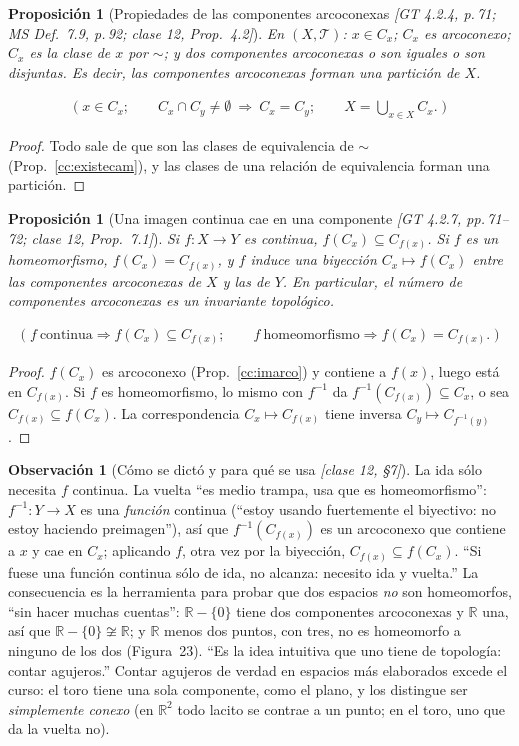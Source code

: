\documentclass[11pt,a4paper]{article}
\newcommand{\lgc}[1]{\par\vspace{-3pt}\begin{gather*}\big(\;#1\;\big)\end{gather*}\vspace{-6pt}}
\theoremstyle{definition}
\newtheorem{observacion}[definicion]{Observación}
\theoremstyle{plain}
\newtheorem{proposicion}[definicion]{Proposición}
\newcommand{\fnt}[1]{{\normalfont\small\itshape\color{gray!150!black}[#1]}}
\newcommand{\R}{\mathbb{R}}
\newcommand{\tp}{\mathcal{T}}
\begin{document}
\begin{proposicion}[Propiedades de las componentes arcoconexas \fnt{GT 4.2.4, p.\,71; MS Def.\ 7.9, p.\,92; clase 12, Prop.\ 4.2}]\label{cc:propcam}
En $(X,\tp)$: $x\in C_x$; $C_x$ es arcoconexo; $C_x$ es la clase de $x$ por $\sim$; y dos componentes arcoconexas o son iguales o son disjuntas. Es decir, las componentes arcoconexas forman una partición de $X$.
\lgc{x\in C_x;\qquad C_x\cap C_y\ne\emptyset\ \Rightarrow\ C_x=C_y;\qquad X=\bigcup_{x\in X}C_x.}
\end{proposicion}

\begin{proof}
Todo sale de que son las clases de equivalencia de $\sim$ (Prop.~\ref{cc:existecam}), y las clases de una relación de equivalencia forman una partición.
\end{proof}

\begin{proposicion}[Una imagen continua cae en una componente \fnt{GT 4.2.7, pp.\,71--72; clase 12, Prop.\ 7.1}]\label{cc:invcam}
Si $f:X\to Y$ es continua, $f(C_x)\subseteq C_{f(x)}$. Si $f$ es un homeomorfismo, $f(C_x)=C_{f(x)}$, y $f$ induce una biyección $C_x\mapsto f(C_x)$ entre las componentes arcoconexas de $X$ y las de $Y$. En particular, el número de componentes arcoconexas es un invariante topológico.
\lgc{f\ \text{continua}\Rightarrow f(C_x)\subseteq C_{f(x)};\qquad f\ \text{homeomorfismo}\Rightarrow f(C_x)=C_{f(x)}.}
\end{proposicion}

\begin{proof}
$f(C_x)$ es arcoconexo (Prop.~\ref{cc:imarco}) y contiene a $f(x)$, luego está en $C_{f(x)}$. Si $f$ es homeomorfismo, lo mismo con $f^{-1}$ da $f^{-1}(C_{f(x)})\subseteq C_x$, o sea $C_{f(x)}\subseteq f(C_x)$. La correspondencia $C_x\mapsto C_{f(x)}$ tiene inversa $C_y\mapsto C_{f^{-1}(y)}$.
\end{proof}

\begin{observacion}[Cómo se dictó y para qué se usa \fnt{clase 12, \S7}]
La ida sólo necesita $f$ continua. La vuelta ``es medio trampa, usa que es homeomorfismo'': $f^{-1}:Y\to X$ es una \emph{función} continua (``estoy usando fuertemente el biyectivo: no estoy haciendo preimagen''), así que $f^{-1}(C_{f(x)})$ es un arcoconexo que contiene a $x$ y cae en $C_x$; aplicando $f$, otra vez por la biyección, $C_{f(x)}\subseteq f(C_x)$. ``Si fuese una función continua sólo de ida, no alcanza: necesito ida y vuelta.''
La consecuencia es la herramienta para probar que dos espacios \emph{no} son homeomorfos, ``sin hacer muchas cuentas'': $\R-\{0\}$ tiene dos componentes arcoconexas y $\R$ una, así que $\R-\{0\}\not\cong\R$; y $\R$ menos dos puntos, con tres, no es homeomorfo a ninguno de los dos (Figura~23). ``Es la idea intuitiva que uno tiene de topología: contar agujeros.'' Contar agujeros de verdad en espacios más elaborados excede el curso: el toro tiene una sola componente, como el plano, y los distingue ser \emph{simplemente conexo} (en $\R^2$ todo lacito se contrae a un punto; en el toro, uno que da la vuelta no).
\end{observacion}
\end{document}
